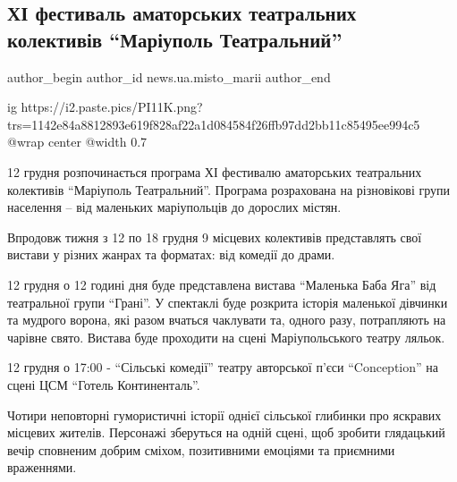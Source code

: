  
 
 
 
 
 
\subsection{ХІ фестиваль аматорських театральних колективів \enquote{Маріуполь Театральний}}
\label{sec:29_11_2021.stz.news.ua.misto_marii.1.12_grudnja_xi_festival_mrpl_teatralnyj}
 
\ifcmt
 author_begin
   author_id news.ua.misto_marii
 author_end
\fi

\ifcmt
  ig https://i2.paste.pics/PI11K.png?trs=1142e84a8812893e619f828af22a1d084584f26ffb97dd2bb11c85495ee994c5
  @wrap center
  @width 0.7
\fi

12 грудня розпочинається програма ХІ фестивалю аматорських театральних
колективів \enquote{Маріуполь Театральний}. Програма  розрахована на різновікові групи
населення – від маленьких маріупольців до дорослих містян.

Впродовж тижня з 12 по 18 грудня 9 місцевих колективів представлять свої
вистави у різних жанрах та форматах: від комедії до драми.

12 грудня о 12 годині дня буде представлена вистава \enquote{Маленька Баба Яга} від
театральної групи \enquote{Грані}. У спектаклі буде розкрита історія маленької дівчинки
та мудрого ворона, які разом вчаться чаклувати та, одного разу, потрапляють на
чарівне свято. Вистава буде проходити на сцені Маріупольського театру ляльок.


12 грудня о  17:00 - \enquote{Сільські комедії} театру авторської п'єси
\enquote{Conception} на  сцені ЦСМ \enquote{Готель Континенталь}.

Чотири неповторні гумористичні історії однієї сільської глибинки про яскравих
місцевих жителів. Персонажі зберуться на одній сцені, щоб зробити глядацький
вечір сповненим добрим сміхом, позитивними емоціями та приємними враженнями.

